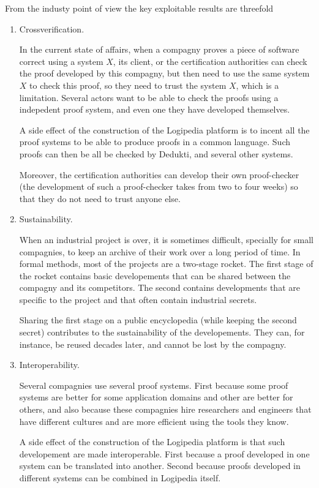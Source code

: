 From the industy point of view the key exploitable results are threefold

\begin{enumerate}
\item Crossverification.

In the current state of affairs, when a compagny proves a piece of
software correct using a system $X$, its client, or the certification
authorities can check the proof developed by this compagny, but then
need to use the same system $X$ to check this proof, so they need to
trust the system $X$, which is a limitation. Several actors want to be
able to check the proofs using a indepedent proof system, and even one
they have developed themselves.

A side effect of the construction of the {\sc Logipedia} platform is
to incent all the proof systems to be able to produce proofs in a
common language. Such proofs can then be all be checked by {\sc
Dedukti}, and several other systems.

Moreover, the certification authorities can develop their own
proof-checker (the development of such a proof-checker takes from two
to four weeks) so that they do not need to trust anyone else.

\item Sustainability.

When an industrial project is over, it is sometimes difficult,
specially for small compagnies, to keep an archive of their work over
a long period of time. In formal methods, most of the projects are a
two-stage rocket. The first stage of the rocket contains basic
developements that can be shared between the compagny and its
competitors. The second contains developments that are specific to the
project and that often contain industrial secrets.

Sharing the first stage on a public encyclopedia (while keeping the
second secret) contributes to the sustainability of the
developements. They can, for instance, be reused decades later, and
cannot be lost by the compagny.

\item Interoperability.

Several compagnies use several proof systems. First because some proof
systems are better for some application domains and other are better
for others, and also because these compagnies hire researchers and
engineers that have different cultures and are more efficient using the
tools they know.

A side effect of the construction of the {\sc Logipedia} platform is
that such developement are made interoperable. First because a proof
developed in one system can be translated into another. Second because
proofs developed in different systems can be combined in {\sc
Logipedia} itself.

\end{enumerate}










